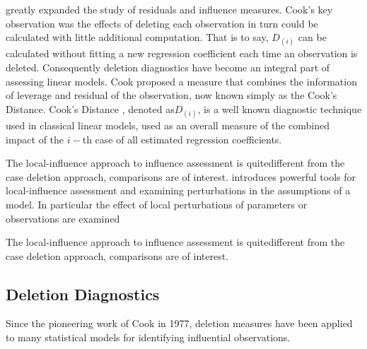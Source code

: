 \documentclass[Main.tex]{subfiles}
\begin{document}
\citet{cook77} greatly expanded the study of residuals and influence measures.  Cook's key observation was the effects of deleting each observation in turn could be calculated with little additional computation. That is to say, $D_{(i)}$ can be calculated without fitting a new regression coefficient each time an observation is deleted.  Consequently deletion diagnostics have become an integral part of assessing linear models. Cook proposed a measure that combines the information of leverage and residual of the observation, now known simply as the Cook's Distance. Cook's Distance , denoted as$D_{(i)}$, is a well known diagnostic technique used in classical linear models, used as an overall measure of the combined impact of the $i-$th case of all estimated regression coefficients.



The local-influence approach to influence assessment is quitedifferent from the case deletion approach, comparisons are of
interest.
	\citet{cook86} introduces powerful tools for local-influence assessment and examining perturbations in the assumptions of a model. In particular the effect of local perturbations of parameters or observations are examined	
	

	
	The local-influence approach to influence assessment is quitedifferent from the case deletion approach, comparisons are of
	interest.
	
	



	
	
	\subsection{Deletion Diagnostics}
	
	Since the pioneering work of Cook in 1977, deletion measures have been applied to many statistical models for identifying influential observations.
	
\end{document}

